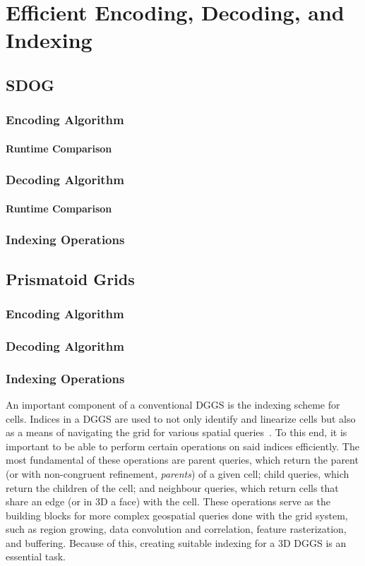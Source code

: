 \chapter{Efficient Encoding, Decoding, and Indexing}

\section{SDOG}
\subsection{Encoding Algorithm}
\subsubsection{Runtime Comparison}
\subsection{Decoding Algorithm}
\subsubsection{Runtime Comparison}
\subsection{Indexing Operations}

\section{Prismatoid Grids}
\subsection{Encoding Algorithm}
\subsection{Decoding Algorithm}
\subsection{Indexing Operations} \label{sec:indexing}
An important component of a conventional DGGS is the indexing scheme for cells.
Indices in a DGGS are used to not only identify and linearize cells but also as a means of navigating the grid for various spatial queries~\cite{alderson2020digital}.
To this end, it is important to be able to perform certain operations on said indices efficiently.
The most fundamental of these operations are parent queries, which return the parent (or with non-congruent refinement, \textit{parents}) of a given cell; child queries, which return the children of the cell; and neighbour queries, which return cells that share an edge (or in 3D a face) with the cell.
These operations serve as the building blocks for more complex geospatial queries done with the grid system, such as region growing, data convolution and correlation, feature rasterization, and buffering.
Because of this, creating suitable indexing for a 3D DGGS is an essential task.


